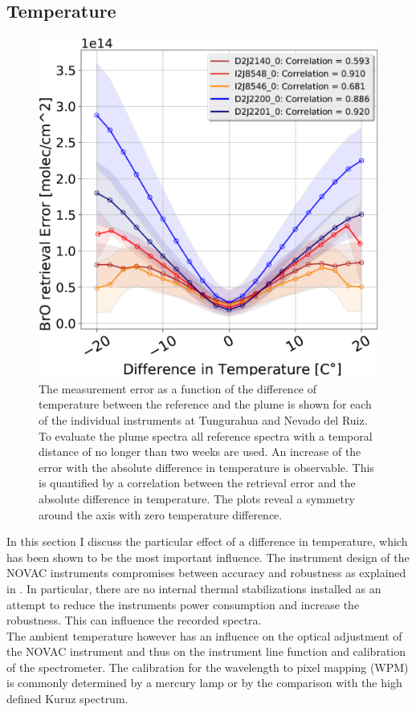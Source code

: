 \subsection{Temperature}
\begin{figure}
	\centering
	\includegraphics[width=0.7\linewidth]{Bilder/DiffTempallInstruments1}
	\caption{The  measurement error as a function of the difference of temperature between the reference and the plume is shown for each of the individual instruments at Tungurahua and Nevado del Ruiz. To evaluate the plume spectra all reference spectra with a temporal distance of no longer than two weeks are used. An increase of the  error with the absolute difference in temperature is observable. This is quantified by a correlation between the  retrieval error and the absolute difference in temperature. The plots reveal a symmetry around the axis with zero temperature difference.}
	\label{fig:difftemp}
\end{figure}
In this section I discuss the particular effect of a difference in temperature, which has been shown to be the most important influence.
The instrument design of the NOVAC instruments compromises between accuracy and robustness as explained in . In particular, there are no internal thermal stabilizations installed as an attempt to reduce the instruments power consumption and increase the robustness. This can influence the recorded spectra.\\
The ambient temperature however has an influence on the optical adjustment of the NOVAC instrument and thus on the instrument line function and calibration of the spectrometer.
The calibration for the wavelength to pixel mapping (WPM) is commonly determined by a mercury lamp or by the comparison with the high defined Kuruz spectrum.
